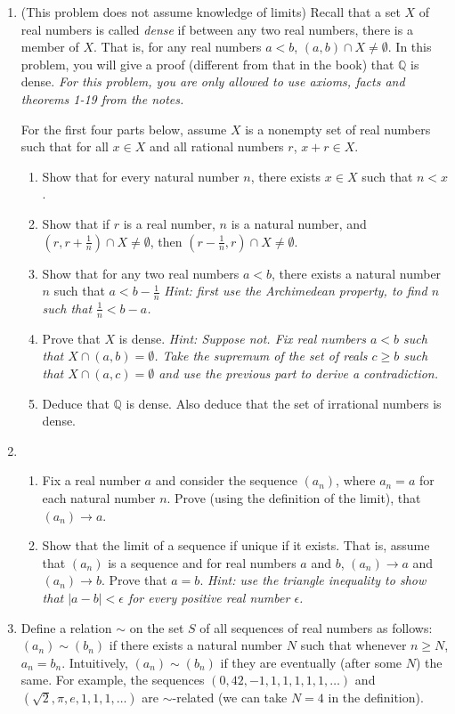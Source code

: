 \documentclass{amsart}
\theoremstyle{definition}
\begin{document}
\begin{enumerate}
\item (This problem does not assume knowledge of limits) Recall that a set $X$ of real numbers is called \emph{dense} if between any two real numbers, there is a member of $X$. That is, for any real numbers $a < b$, $(a, b) \cap X \neq \emptyset$. In this problem, you will give a proof (different from that in the book) that $\mathbb{Q}$ is dense. \emph{For this problem, you are only allowed to use axioms, facts and theorems 1-19 from the notes.}

  For the first four parts below, assume $X$ is a nonempty set of real numbers such that for all $x \in X$ and all rational numbers $r$, $x + r \in X$. 
  
  \begin{enumerate}
  \item Show that for every natural number $n$, there exists $x \in X$ such that $n < x$. 
  \item Show that if $r$ is a real number, $n$ is a natural number, and $(r, r + \frac{1}{n}) \cap X \neq \emptyset$, then $(r - \frac{1}{n}, r) \cap X \neq \emptyset$.
  \item Show that for any two real numbers $a < b$, there exists a natural number $n$ such that $a < b - \frac{1}{n}$ \emph{Hint: first use the Archimedean property, to find $n$ such that $\frac{1}{n} < b - a$.}
  \item Prove that $X$ is dense. \emph{Hint: Suppose not. Fix real numbers $a < b$ such that $X \cap (a, b) = \emptyset$. Take the supremum of the set of reals $c \ge b$ such that $X \cap (a, c) = \emptyset$ and use the previous part to derive a contradiction.}
  \item Deduce that $\mathbb{Q}$ is dense. Also deduce that the set of irrational numbers is dense.
  \end{enumerate}
\item
  \begin{enumerate}
  \item Fix a real number $a$ and consider the sequence $(a_n)$, where $a_n = a$ for each natural number $n$. Prove (using the definition of the limit), that $(a_n) \to a$.
  \item Show that the limit of a sequence if unique if it exists. That is, assume that $(a_n)$ is a sequence and for real numbers $a$ and $b$, $(a_n) \to a$ and $(a_n) \to b$. Prove that $a = b$. \emph{Hint: use the triangle inequality to show that $|a - b| < \epsilon$ for every positive real number $\epsilon$.}
  \end{enumerate}
\item Define a relation $\sim$ on the set $S$ of all sequences of real numbers as follows: $(a_n) \sim (b_n)$ if there exists a natural number $N$ such that whenever $n \ge N$, $a_n = b_n$. Intuitively, $(a_n) \sim (b_n)$ if they are eventually (after some $N$) the same. For example, the sequences $(0, 42, -1, 1, 1, 1, 1, 1, \ldots)$ and $(\sqrt{2}, \pi, e, 1, 1, 1, \ldots)$ are $\sim$-related (we can take $N = 4$ in the definition).


\end{enumerate}
\end{document}
